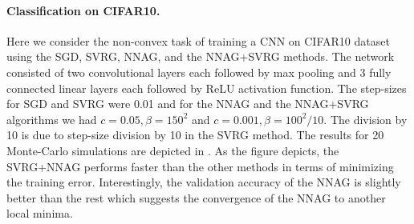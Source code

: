\documentclass{article}
\theoremstyle{plain}
\theoremstyle{definition}
\theoremstyle{remark}
\begin{document}
\paragraph{Classification on CIFAR10.}
Here we consider the non-convex task of training a CNN on CIFAR10 dataset \citep{krizhevsky2009learning} %
using the SGD, SVRG, NNAG, and the NNAG+SVRG methods. The network consisted of two convolutional layers each followed by max pooling and 3 fully connected linear layers each followed by ReLU activation function. The step-sizes for SGD and SVRG were 0.01 and for the NNAG and the NNAG+SVRG algorithms we had \(c=0.05,\beta = 150^2\) and \(c=0.001,\beta = 100^2/10\). The division by 10 is due to step-size division by 10 in the SVRG method. The results for 20 Monte-Carlo simulations are depicted in . As the figure depicts, the SVRG+NNAG performs faster than the other methods in terms of minimizing the training error. Interestingly, the validation accuracy of the NNAG is slightly better than the rest which suggests the convergence of the NNAG to another local minima. 





\end{document}
